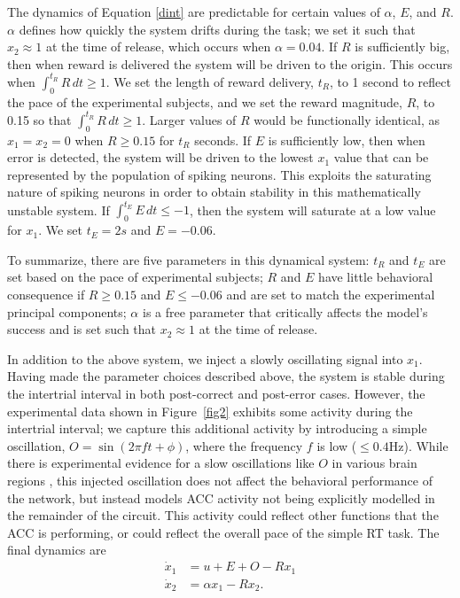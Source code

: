 \documentclass[11pt]{article}
\begin{document}
The dynamics of Equation \eqref{dint}
are predictable for certain values
of $\alpha$, $E$, and $R$.
$\alpha$ defines how quickly
the system drifts during the task;
we set it such that $x_2 \approx 1$
at the time of release,
which occurs when $\alpha = 0.04$.
If $R$ is sufficiently big,
then when reward is delivered
the system will be driven to the origin.
This occurs when $\int_0^{t_R} R\,dt \ge 1$.
We set the length of reward delivery,
$t_R$, to 1 second to reflect the pace
of the experimental subjects,
and we set the reward magnitude,
$R$, to 0.15 so that $\int_0^{t_R} R\,dt \ge 1$.
Larger values of $R$ would be functionally identical,
as $x_1 = x_2 = 0$ when $R \ge 0.15$ for $t_R$ seconds.
If $E$ is sufficiently low,
then when error is detected,
the system will be driven to
the lowest $x_1$ value that can
be represented by the population
of spiking neurons.
This exploits the saturating nature
of spiking neurons in order to
obtain stability in this
mathematically unstable system.
If $\int_0^{t_E} E\,dt \le -1$,
then the system will saturate
at a low value for $x_1$.
We set $t_E = 2 s$ and $E = -0.06$.

To summarize, there are five parameters
in this dynamical system:
$t_R$ and $t_E$ are set based on the pace
of experimental subjects;
$R$ and $E$ have little behavioral
consequence if $R \ge 0.15$ and
$E \le -0.06$ and are set
to match the experimental principal components;
$\alpha$ is a free parameter
that critically affects the model's success
and is set such that $x_2 \approx 1$
at the time of release.

In addition to the above system,
we inject a slowly oscillating signal into $x_1$.
Having made the parameter choices
described above,
the system is stable during the intertrial
interval in both post-correct and post-error
cases.
However, the experimental data shown in
Figure~\ref{fig2} exhibits some activity during
the intertrial interval;
we capture this additional activity
by introducing a simple oscillation,
$O = \sin(2 \pi f t + \phi)$,
where the frequency $f$ is low ($\le 0.4$Hz).
While there is experimental evidence for
a slow oscillations like $O$ in various brain regions
\cite{Buzsaki2004}, this injected oscillation
does not affect the behavioral performance of the network,
but instead models ACC activity
not being explicitly modelled in
the remainder of the circuit.
This activity could reflect
other functions that the ACC is performing,
or could reflect the overall pace
of the simple RT task.
The final dynamics are
\begin{align} \label{dint-full}
  \dot{x}_1 &= u + E + O - R x_1 \nonumber \\
  \dot{x}_2 &= \alpha x_1 - R x_2.
\end{align}
\end{document}
